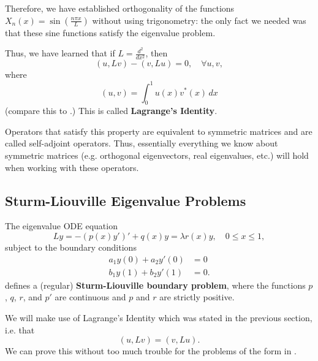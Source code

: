 \begin{enumerate}
	Therefore, we have established orthogonality of the functions $X_n(x) = \sin\left(\frac{n\pi x}{L}\right)$ without using trigonometry: the only fact we needed was that these sine functions satisfy the eigenvalue problem.
\end{enumerate}

Thus, we have learned that if $L = \frac{d^2}{dx^2}$, then
\begin{equation}
	(u, Lv) - (v, Lu) = 0, \quad \forall u,v,
\end{equation}
where
\[
(u,v) = \int_0^1 u(x)v^*(x) \,dx
\]
(compare this to .) This is called \textbf{Lagrange's Identity}.

Operators that satisfy this property are equivalent to symmetric matrices and are called self-adjoint operators. Thus, essentially everything we know about symmetric matrices (e.g. orthogonal eigenvectors, real eigenvalues, etc.) will hold when working with these operators.

\subsection{Sturm-Liouville Eigenvalue Problems}

\begin{definition}
	The eigenvalue ODE equation
	\begin{equation}\label{eq:sturmliou}
		Ly = -\left(p(x)y'\right)' + q(x)y = \lambda r(x)y, \quad 0 \leq x \leq 1,
	\end{equation}
	subject to the boundary conditions
	\begin{equation}\label{eq:sturmliouconds}
		\begin{alignedat}{1}
			a_1y(0) + a_2y'(0) &= 0 \\
			b_1y(1) + b_2y'(1) &= 0.
		\end{alignedat}
	\end{equation}
	defines a (regular) \textbf{Sturm-Liouville boundary problem}, where the functions $p$, $q$, $r$, and $p'$ are continuous and $p$ and $r$ are strictly positive.
\end{definition}

We will make use of Lagrange's Identity which was stated in the previous section, i.e. that
\[
(u, Lv) = (v, Lu).
\]
We can prove this without too much trouble for the problems of the form in .

